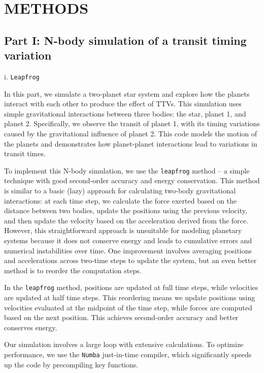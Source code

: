\documentclass[linenumbers]{aastex631}
\begin{document}
\vspace{1cm}
\newpage
\section{METHODS} \label{sec:Methods}
\subsection{Part I: N-body simulation of a transit timing variation}
i. {\tt\string Leapfrog} \label{sec:Leapfrog}
\par \vspace{.01cm}
In this part, we simulate a two-planet star system and explore how the planets interact with each other to produce the effect of TTVs. This simulation uses simple gravitational interactions between three bodies: the star, planet 1, and planet 2. Specifically, we observe the transit of planet 1, with its timing variations caused by the gravitational influence of planet 2. This code models the motion of the planets and demonstrates how planet-planet interactions lead to variations in transit times.

To implement this N-body simulation, we use the {\tt\string leapfrog} method – a simple technique with good second-order accuracy and energy conservation. This method is similar to a basic (lazy) approach for calculating two-body gravitational interactions: at each time step, we calculate the force exerted based on the distance between two bodies, update the positions using the previous velocity, and then update the velocity based on the acceleration derived from the force. However, this straightforward approach is unsuitable for modeling planetary systems because it does not conserve energy and leads to cumulative errors and numerical instabilities over time. One improvement involves averaging positions and accelerations across two-time steps to update the system, but an even better method is to reorder the computation steps.

In the {\tt\string leapfrog} method, positions are updated at full time steps, while velocities are updated at half time steps. This reordering means we update positions using velocities evaluated at the midpoint of the time step, while forces are computed based on the next position. This achieves second-order accuracy and better conserves energy.

Our simulation involves a large loop with extensive calculations. To optimize performance, we use the {\tt\string Numba} just-in-time compiler, which significantly speeds up the code by precompiling key functions.
\end{document}
